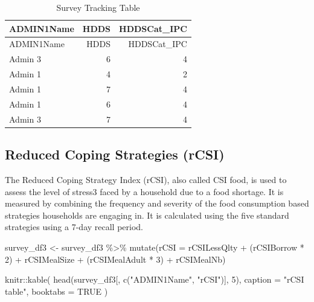 \documentclass[
  letterpaper,
  DIV=11,
  numbers=noendperiod]{scrreprt}
\newenvironment{Shaded}{\begin{snugshade}}{\end{snugshade}}
\newcommand{\AttributeTok}[1]{\textcolor[rgb]{0.40,0.45,0.13}{#1}}
\newcommand{\ConstantTok}[1]{\textcolor[rgb]{0.56,0.35,0.01}{#1}}
\newcommand{\DecValTok}[1]{\textcolor[rgb]{0.68,0.00,0.00}{#1}}
\newcommand{\FunctionTok}[1]{\textcolor[rgb]{0.28,0.35,0.67}{#1}}
\newcommand{\NormalTok}[1]{\textcolor[rgb]{0.00,0.23,0.31}{#1}}
\newcommand{\OtherTok}[1]{\textcolor[rgb]{0.00,0.23,0.31}{#1}}
\newcommand{\SpecialCharTok}[1]{\textcolor[rgb]{0.37,0.37,0.37}{#1}}
\newcommand{\StringTok}[1]{\textcolor[rgb]{0.13,0.47,0.30}{#1}}
\begin{document}
\begin{longtable}[]{@{}lrr@{}}
\caption{Survey Tracking Table}\tabularnewline
\toprule\noalign{}
ADMIN1Name & HDDS & HDDSCat\_IPC \\
\midrule\noalign{}
\endfirsthead
\toprule\noalign{}
ADMIN1Name & HDDS & HDDSCat\_IPC \\
\midrule\noalign{}
\endhead
\bottomrule\noalign{}
\endlastfoot
Admin 3 & 6 & 4 \\
Admin 1 & 4 & 2 \\
Admin 1 & 7 & 4 \\
Admin 1 & 6 & 4 \\
Admin 3 & 7 & 4 \\
\end{longtable}

\subsection{Reduced Coping Strategies
(rCSI)}\label{reduced-coping-strategies-rcsi}

The Reduced Coping Strategy Index (rCSI), also called CSI food, is used
to assess the level of stress3 faced by a household due to a food
shortage. It is measured by combining the frequency and severity of the
food consumption based strategies households are engaging in. It is
calculated using the five standard strategies using a 7-day recall
period.

\begin{Shaded}
\begin{Highlighting}[]
\NormalTok{survey\_df3 }\OtherTok{\textless{}{-}}\NormalTok{ survey\_df3 }\SpecialCharTok{\%\textgreater{}\%} 
  \FunctionTok{mutate}\NormalTok{(}\AttributeTok{rCSI =}\NormalTok{ rCSILessQlty }\SpecialCharTok{+}\NormalTok{ (rCSIBorrow }\SpecialCharTok{*} \DecValTok{2}\NormalTok{) }\SpecialCharTok{+}\NormalTok{ rCSIMealSize }\SpecialCharTok{+}\NormalTok{ (rCSIMealAdult }\SpecialCharTok{*} \DecValTok{3}\NormalTok{) }\SpecialCharTok{+}\NormalTok{ rCSIMealNb)}
\end{Highlighting}
\end{Shaded}

\begin{Shaded}
\begin{Highlighting}[]
\NormalTok{knitr}\SpecialCharTok{::}\FunctionTok{kable}\NormalTok{(}
  \FunctionTok{head}\NormalTok{(survey\_df3[, }\FunctionTok{c}\NormalTok{(}\StringTok{"ADMIN1Name"}\NormalTok{, }\StringTok{"rCSI"}\NormalTok{)], }\DecValTok{5}\NormalTok{),}
  \AttributeTok{caption =} \StringTok{"rCSI table"}\NormalTok{,}
  \AttributeTok{booktabs =} \ConstantTok{TRUE}
\NormalTok{)}
\end{Highlighting}
\end{Shaded}
\end{document}
